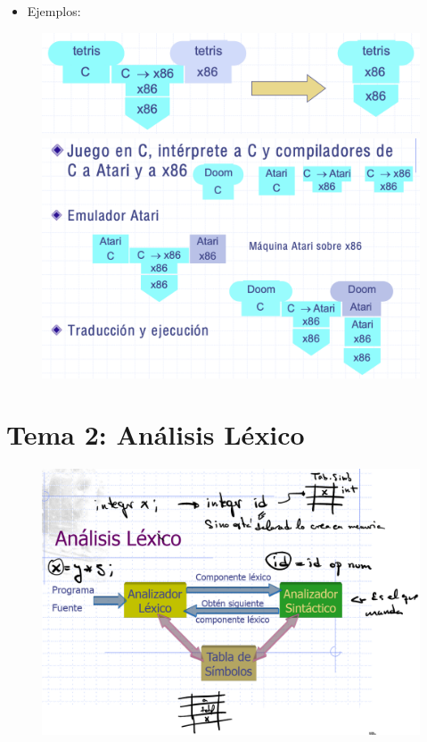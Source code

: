 \documentclass[12pt, twoside, openright]{report} %
\begin{document}
\begin{itemize}
	\item
	  Ejemplos:
\end{itemize}

\begin{figure}[H]
	{\includegraphics[scale=.2]{Untitled 25.png}}
	{\includegraphics[scale=.2]{Untitled 26.png}}
\end{figure}

\chapter{Tema 2: Análisis Léxico}

\begin{figure}[H]
	{\includegraphics[scale=.25]{Untitled 27.png}}
\end{figure}
\end{document}
